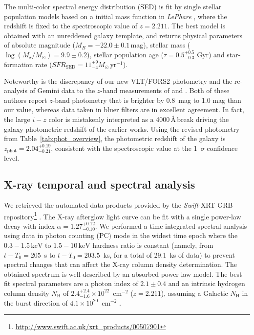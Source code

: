 \documentclass{aa}    %
\begin{document}
The multi-color spectral energy distribution (SED) is fit by
\citet{Bruzual2003} single stellar population models based on a
\citet{Chabrier2003} initial mass function in \emph{LePhare} \citep{Ilbert2006},
where the redshift is fixed to the spectroscopic value of $z=2.211$. The best
model is obtained with an unreddened galaxy template, and returns physical
parameters of absolute magnitude ($M_B=-22.0\pm0.1$\,mag), stellar mass
($\log(M_{\star}/M_\odot) = 9.9\pm0.2$), stellar population age ($\tau =
0.5_{-0.3}^{+0.5}$ Gyr) and star-formation rate
($SFR_{\mathrm{SED}}=11_{-4}^{+9} M_\odot\,\mathrm{yr}^{-1}$). %

Noteworthy is the discrepancy of our new VLT/FORS2 photometry and the
re-analysis of Gemini data to the $z$-band measurements of \citet{Margutti2012} and
\citet{Sakamoto2013}. Both of these authors report $z$-band photometry that is brighter 
by 0.8~mag to 1.0 mag than our value, whereas data taken in bluer filters are in excellent agreement. In fact, the large $i-z$ color is mistakenly interpreted as a 4000\,\AA\,break
driving the galaxy photometric redshift of the earlier works. Using
the revised photometry from Table~\ref{tab:phot_overview}, the photometric redshift of the
galaxy is $z_{\mathrm{phot}}=2.04_{-0.21}^{+0.19}$, consistent with the
spectroscopic value at the 1~$\sigma$ confidence level.


\subsection{X-ray temporal and spectral analysis}

We retrieved the automated data products provided by the \textit{Swift}-XRT GRB
repository\footnote{\url{http://www.swift.ac.uk/xrt\_products/00507901}}
\citep{Evans2009}. The X-ray afterglow light curve can be fit with a single power-law decay with
index $\alpha=1.27_{-0.10}^{+0.12}$. We performed a time-integrated spectral
analysis using data in photon counting (PC) mode in the widest time epoch where
the $0.3-1.5\,\mathrm{keV}$ to $1.5-10\,\mathrm{keV}$ hardness ratio is constant
(namely, from $t-T_0 = 205$~s to $t-T_0 = 203.5$~ks, for a total of 29.1~ks of
data) to prevent spectral changes that can affect the X-ray column density
determination. The obtained spectrum is well described by an absorbed power-law
model. The best-fit spectral parameters are a photon index of $2.1 \pm 0.4$ and
an intrinsic hydrogen column density $N_{\mathrm{H}}$ of $2.4_{-1.6}^{+2.4}
\times 10^{22}$~cm$^{-2}$ ($z=2.211$), assuming a Galactic $N_{\mathrm{H}}$ in
the burst direction of $4.1 \times 10^{20}$~cm$^{-2}$ \cite{Willingale2013}.
\end{document}
